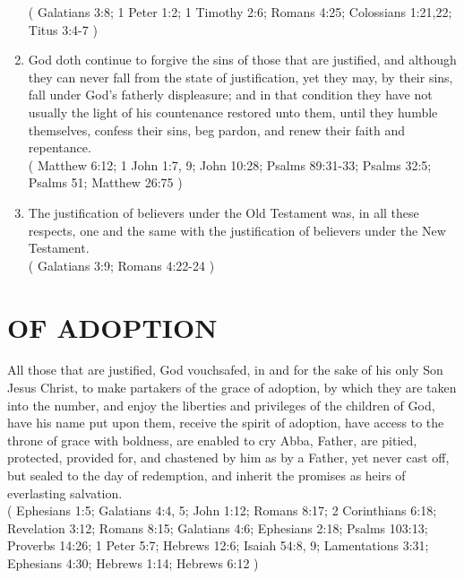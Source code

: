 \documentclass[12pt,a4paper]{book}
\begin{document}
\begin{enumerate}
( Galatians 3:8; 1 Peter 1:2; 1 Timothy 2:6; Romans 4:25; Colossians 1:21,22; Titus 3:4-7 )
\item
\label{ch-jus-5}
God doth continue to forgive the sins of those that are justified, and although they can never fall from the state of justification, yet they may, by their sins, fall under God's fatherly displeasure; and in that condition they have not usually the light of his countenance restored unto them, until they humble themselves, confess their sins, beg pardon, and renew their faith and repentance.\\
( Matthew 6:12; 1 John 1:7, 9; John 10:28; Psalms 89:31-33; Psalms 32:5; Psalms 51; Matthew 26:75 )
\item
\label{ch-jus-6}
The justification of believers under the Old Testament was, in all these respects, one and the same with the justification of believers under the New Testament.\\
( Galatians 3:9; Romans 4:22-24 )
\end{enumerate}

\chapter{OF ADOPTION}
\label{ch-adop}
All those that are justified, God vouchsafed, in and for the sake of his only Son Jesus Christ, to make partakers of the grace of adoption, by which they are taken into the number, and enjoy the liberties and privileges of the children of God, have his name put upon them, receive the spirit of adoption, have access to the throne of grace with boldness, are enabled to cry Abba, Father, are pitied, protected, provided for, and chastened by him as by a Father, yet never cast off, but sealed to the day of redemption, and inherit the promises as heirs of everlasting salvation.\\
( Ephesians 1:5; Galatians 4:4, 5; John 1:12; Romans 8:17; 2 Corinthians 6:18; Revelation 3:12; Romans 8:15; Galatians 4:6; Ephesians 2:18; Psalms 103:13; Proverbs 14:26; 1 Peter 5:7; Hebrews 12:6; Isaiah 54:8, 9; Lamentations 3:31; Ephesians 4:30; Hebrews 1:14; Hebrews 6:12 )
\end{document}
